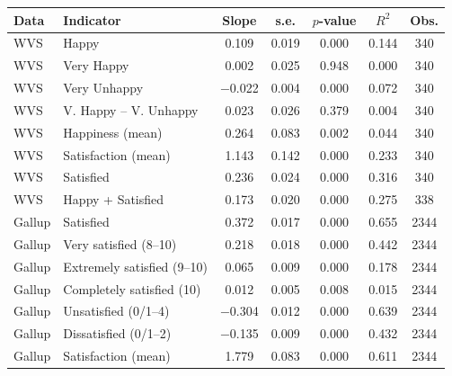 \begin{tabular}{llccccc}
\toprule
Data & Indicator & Slope & s.e. & $p$-value & $R^2$ & Obs. \\
\midrule
WVS & Happy & 0.109 & 0.019 & 0.000 & 0.144 & 340 \\
WVS & Very Happy & 0.002 & 0.025 & 0.948 & 0.000 & 340 \\
WVS & Very Unhappy & \ensuremath{-}0.022 & 0.004 & 0.000 & 0.072 & 340 \\
WVS & V. Happy -- V. Unhappy & 0.023 & 0.026 & 0.379 & 0.004 & 340 \\
WVS & Happiness (mean) & 0.264 & 0.083 & 0.002 & 0.044 & 340 \\
WVS & Satisfaction (mean) & 1.143 & 0.142 & 0.000 & 0.233 & 340 \\
WVS & Satisfied & 0.236 & 0.024 & 0.000 & 0.316 & 340 \\
WVS & Happy + Satisfied & 0.173 & 0.020 & 0.000 & 0.275 & 338 \\
\midrule
Gallup & Satisfied & 0.372 & 0.017 & 0.000 & 0.655 & 2344 \\
Gallup & Very satisfied (8--10) & 0.218 & 0.018 & 0.000 & 0.442 & 2344 \\
Gallup & Extremely satisfied (9--10) & 0.065 & 0.009 & 0.000 & 0.178 & 2344 \\
Gallup & Completely satisfied (10) & 0.012 & 0.005 & 0.008 & 0.015 & 2344 \\
Gallup & Unsatisfied (0/1--4) & \ensuremath{-}0.304 & 0.012 & 0.000 & 0.639 & 2344 \\
Gallup & Dissatisfied (0/1--2) & \ensuremath{-}0.135 & 0.009 & 0.000 & 0.432 & 2344 \\
Gallup & Satisfaction (mean) & 1.779 & 0.083 & 0.000 & 0.611 & 2344 \\
\bottomrule
\end{tabular}
